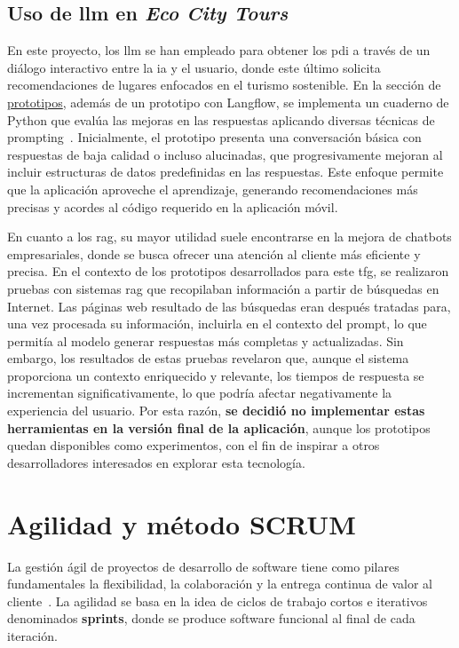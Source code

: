 	\subsection{Uso de \acrlong{llm} en \textit{Eco City Tours}}
	En este proyecto, los \acrlong{llm} se han empleado para obtener los \acrfull{pdi} a través de un diálogo interactivo entre la \acrlong{ia} y el usuario, donde este último solicita recomendaciones de lugares enfocados en el turismo sostenible. En la sección de \href{https://github.com/fps1001/TFGII_FPisot/tree/main/project-prototypes/README.md}{prototipos}, además de un prototipo con Langflow, se implementa un cuaderno de Python que evalúa las mejoras en las respuestas aplicando diversas técnicas de prompting~\cite{promptingguide}. Inicialmente, el prototipo presenta una conversación básica con respuestas de baja calidad o incluso alucinadas, que progresivamente mejoran al incluir estructuras de datos predefinidas en las respuestas. Este enfoque permite que la aplicación aproveche el aprendizaje, generando recomendaciones más precisas y acordes al código requerido en la aplicación móvil.

	En cuanto a los \acrfull{rag}, su mayor utilidad suele encontrarse en la mejora de chatbots empresariales, donde se busca ofrecer una atención al cliente más eficiente y precisa. En el contexto de los prototipos desarrollados para este \acrshort{tfg}, se realizaron pruebas con sistemas \acrshort{rag} que recopilaban información a partir de búsquedas en Internet. Las páginas web resultado de las búsquedas eran después tratadas para, una vez procesada su información,  incluirla en el contexto del prompt, lo que permitía al modelo generar respuestas más completas y actualizadas. Sin embargo, los resultados de estas pruebas revelaron que, aunque el sistema proporciona un contexto enriquecido y relevante, los tiempos de respuesta se incrementan significativamente, lo que podría afectar negativamente la experiencia del usuario. Por esta razón,\textbf{ se decidió no implementar estas herramientas en la versión final de la aplicación}, aunque los prototipos quedan disponibles como experimentos, con el fin de inspirar a otros desarrolladores interesados en explorar esta tecnología.

\section{Agilidad y método SCRUM}
La gestión ágil de proyectos de desarrollo de software tiene como pilares fundamentales la flexibilidad, la colaboración y la entrega continua de valor al cliente~\cite{agile_alliance}. La agilidad se basa en la idea de ciclos de trabajo cortos e iterativos denominados \textbf{sprints}, donde se produce software funcional al final de cada iteración.

